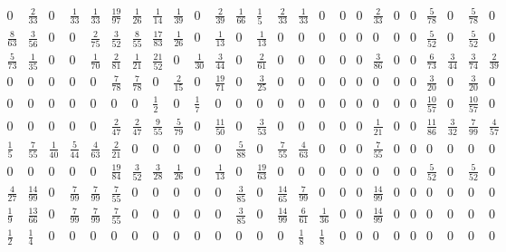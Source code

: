 \documentclass[11pt]{report}
\begin{document}
\begin{appendices}
\begin{landscape}
\begin{figure} [h!]
\begin{equation*}
\begin{array}{ccccccccccccccccccccccccc}
0&\frac{2}{33}&0&\frac{1}{33}&\frac{1}{33}&\frac{19}{97}&\frac{1}{26}&\frac{1}{14}&\frac{1}{39}&0&\frac{2}{39}&\frac{1}{66}&\frac{1}{5}&\frac{2}{33}&\frac{1}{33}&0&0&0&\frac{2}{33}&0&0&\frac{5}{78}&0&\frac{5}{78}&0\\

\frac{8}{63}&\frac{3}{56}&0&0&\frac{2}{75}&\frac{3}{52}&\frac{8}{55}&\frac{17}{83}&\frac{1}{26}&0&\frac{1}{13}&0&\frac{1}{13}&0&0&0&0&0&0&0&0&\frac{5}{52}&0&\frac{5}{52}&0\\

\frac{5}{73}&\frac{1}{35}&0&0&\frac{1}{70}&\frac{2}{81}&\frac{1}{21}&\frac{21}{52}&0&\frac{1}{30}&\frac{3}{44}&0&\frac{2}{61}&0&0&0&0&0&\frac{3}{86}&0&0&\frac{6}{73}&\frac{3}{44}&\frac{3}{74}&\frac{2}{39}\\

0&0&0&0&0&\frac{7}{78}&\frac{7}{78}&0&\frac{2}{15}&0&\frac{19}{71}&0&\frac{3}{25}&0&0&0&0&0&0&0&0&\frac{3}{20}&0&\frac{3}{20}&0\\

0&0&0&0&0&0&0&\frac{1}{2}&0&\frac{1}{7}&0&0&0&0&0&0&0&0&0&0&0&\frac{10}{57}&0&\frac{10}{57}&0\\

0&0&0&0&0&\frac{2}{47}&\frac{2}{47}&\frac{9}{55}&\frac{5}{79}&0&\frac{11}{50}&0&\frac{3}{53}&0&0&0&0&0&\frac{1}{21}&0&0&\frac{11}{86}&\frac{3}{32}&\frac{7}{99}&\frac{4}{57}\\

\frac{1}{5}&\frac{7}{55}&\frac{1}{40}&\frac{5}{44}&\frac{4}{63}&\frac{2}{21}&0&0&0&0&0&\frac{5}{88}&0&\frac{7}{55}&\frac{4}{63}&0&0&0&\frac{7}{55}&0&0&0&0&0&0\\

0&0&0&0&0&\frac{19}{84}&\frac{3}{52}&\frac{3}{28}&\frac{1}{26}&0&\frac{1}{13}&0&\frac{19}{63}&0&0&0&0&0&0&0&0&\frac{5}{52}&0&\frac{5}{52}&0\\

\frac{4}{27}&\frac{14}{99}&0&\frac{7}{99}&\frac{7}{99}&\frac{7}{55}&0&0&0&0&0&\frac{3}{85}&0&\frac{14}{65}&\frac{7}{99}&0&0&0&\frac{14}{99}&0&0&0&0&0&0\\

\frac{1}{9}&\frac{13}{66}&0&\frac{7}{99}&\frac{7}{99}&\frac{7}{55}&0&0&0&0&0&\frac{3}{85}&0&\frac{14}{99}&\frac{6}{61}&\frac{1}{36}&0&0&\frac{14}{99}&0&0&0&0&0&0\\

\frac{1}{2}&\frac{1}{4}&0&0&0&0&0&0&0&0&0&0&0&0&\frac{1}{8}&\frac{1}{8}&0&0&0&0&0&0&0&0&0\\


\end{array}
\end{equation*}
\end{figure}
\end{landscape}
\end{appendices}
\end{document}
